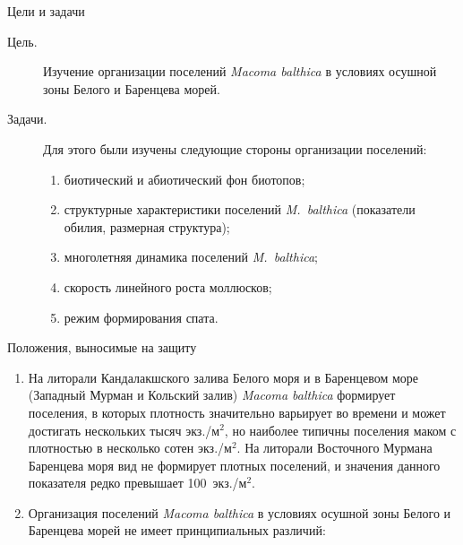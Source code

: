 \documentclass{beamer}
\begin{document}
\begin{frame}{Цели и задачи}
\begin{description}
	\item[Цель.] Изучение организации поселений {\it Macoma balthica} в условиях осушной зоны Белого и Баренцева морей.

	\item[Задачи.]
Для этого были изучены следующие стороны организации поселений:
  \begin{enumerate}
    \item биотический и абиотический фон биотопов;
    \item структурные характеристики поселений \textit{M.~balthica} (показатели обилия, размерная структура);
    \item многолетняя динамика поселений \textit{M.~balthica};
    \item скорость линейного роста моллюсков;
    \item режим формирования спата.
  \end{enumerate}
\end{description}
\end{frame}


\begin{frame}{Положения, выносимые на защиту}
\begin{small}
\begin{enumerate}
\item На литорали Кандалакшского залива Белого моря и в Баренцевом море (Западный Мурман и Кольский залив) \textit{Macoma balthica} формирует поселения, в которых плотность значительно варьирует во времени и может достигать нескольких тысяч экз./м$^2$, но наиболее типичны поселения маком с плотностью в несколько сотен экз./м$^2$. На литорали Восточного Мурмана Баренцева моря вид не формирует плотных поселений, и значения данного показателя редко превышает 100~экз./м$^2$.

\item Организация поселений  \textit{Macoma balthica} в условиях осушной зоны Белого и Баренцева морей не имеет принципиальных различий:
	\begin{itemize}
	\end{itemize}

\end{enumerate}
\end{small}
\end{frame}
\end{document}
